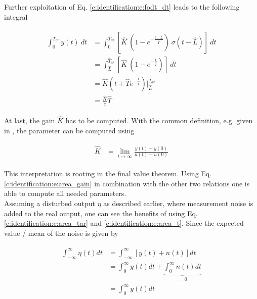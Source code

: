 Further exploitation of Eq. \ref{c:identification:e:fodt_dt} leads to the following integral

\begin{align}
\begin{split}
\int_0^{\hat{T}_{ar}} y(t) ~dt &= \int_0^{\hat{T}_{ar}} \left[ \hat{K} ~\left( 1 - e^{-\frac{t- \hat{L}}{\hat{T}}}\right)~ \sigma(t-\hat{L}) \right] ~dt \\
&= \int_{\hat{L}}^{\hat{T}_{ar}} \left[ \hat{K} ~\left( 1 - e^{-\frac{t}{\hat{T}}}\right) \right]~dt \\
&= \hat{K} \left( t + \hat{T} e^{-\frac{t}{\hat{T}}} \right) \Bigg\rvert_{\hat{L}}^{\hat{T}_{ar}} \\
&= \frac{\hat{K}}{e} \hat{T}
\end{split}
\label{c:identification:e:area_t}
\end{align}

At last, the gain $\hat{K}$ has to be computed. With the common definition, e.g. given in \cite[p.213]{Lunze2016}, the parameter can be computed using

\begin{align}
\begin{split}
\hat{K} &= \lim_{t\mapsto \infty} \frac{y(t)-y(0)}{u(t)-u(0)}
\end{split}
\label{c:identification:e:area_gain}
\end{align}

This interpretation is rooting in the final value theorem. Using Eq. \ref{c:identification:e:area_gain} in combination with the other two relations one is able to compute all needed parameters.\\

Assuming a disturbed output $\eta$ as described earlier, where measurement noise is added to the real output, one can see the benefits of using Eq.\ref{c:identification:e:area_tar} and \ref{c:identification:e:area_t}. Since the expected value / mean of the noise is given by 

\begin{align}
\begin{split}
\int_{-\infty}^{\infty} \eta \left( t \right) dt&= \int_{-\infty}^{\infty} \left[ y \left(t \right) + n\left(t\right) \right] dt \\
&= \int_{0}^{\infty}  y \left(t \right) dt + \underbrace{\int_{0}^{\infty} n\left(t\right) dt }_{= 0}\\
&= \int_{0}^{\infty}  y \left(t \right) dt
\end{split}
\label{c:identification:e:integral_noisechancel}
\end{align}

